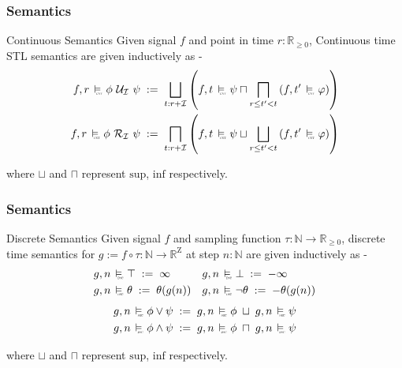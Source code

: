 \documentclass{beamer}
\newcommand{\typeTime}{\mathbb{R}_{\geq 0}}
\newcommand{\typeReal}{\mathbb{R}}
\newcommand{\typeNat}{\mathbb{N}}
\newcommand{\until}{\mathcal{U}}
\newcommand{\release}{\mathcal{R}}
\newcommand{\interval}{\mathcal{I}}
\newcommand{\Z}{\text{Z}}
\newcommand{\discrete}{\raisebox{-0.1ex}{\scalebox{0.25}{\textrm{DSC}}}}
\newcommand{\cont}{\raisebox{-0.1ex}{\scalebox{0.25}{\textrm{CNT}}}}
\newcommand{\discreteSatisfy}{\ \stackMath\stackunder[0pt]{\vDash}{\hspace*{0.3em}\discrete}\ }
\newcommand{\contSatisfy}{\ \stackMath\stackunder[0pt]{\vDash}{\hspace*{0.3em}\cont}\ }
\newcommand{\robustAssign}{\; := \;}
\begin{document}
\begin{frame}
    \frametitle{Semantics}
    \begin{block}{Continuous Semantics}
        Given signal $f$ and point in time $r : \typeTime$,
        Continuous time STL semantics are given inductively as -
        \begin{align*}
            f, r \contSatisfy \phi\ \until_{\interval}\ \psi
           \robustAssign \bigsqcup_{t: r+\interval}\left( f, t \contSatisfy \psi
           \sqcap \bigsqcap_{r \leq t' < t} \left( f, t' \contSatisfy \varphi
            \right ) \right) \\
            f, r \contSatisfy \phi\ \release_{\interval}\ \psi
           \robustAssign \bigsqcap_{t: r+\interval}\left( f, t \contSatisfy \psi
           \sqcup \bigsqcup_{r \leq t' < t} \left( f, t' \contSatisfy \varphi
            \right ) \right)
        \end{align*}
    \end{block}
    where $\sqcup$ and $\sqcap$ represent $\text{sup}$, $\text{inf}$ respectively.
\end{frame}

\begin{frame}
    \frametitle{Semantics}
    \begin{block}{Discrete Semantics}
        Given signal $f$ and sampling function $\tau : \typeNat
        \to \typeTime$, discrete time semantics for $g := f \circ \tau : \typeNat
        \to  \typeReal^{\Z}$ at step $n:\typeNat$ are given inductively as -
        \begin{align*}
              g, n &\discreteSatisfy \top       \robustAssign \infty &
              g, n &\discreteSatisfy \bot       \robustAssign -\infty \\
              g, n &\discreteSatisfy \theta     \robustAssign \theta(g(n)) &
              g, n &\discreteSatisfy \neg\theta \robustAssign -\theta(g(n)) \\
        \end{align*}
        \vspace{-1.6cm}
        \begin{align*}
            g, n \discreteSatisfy \phi \vee \psi  \robustAssign  g, n \discreteSatisfy \phi \; \sqcup \; g, n\discreteSatisfy \psi \\
            g, n \discreteSatisfy \phi \wedge \psi  \robustAssign  g, n \discreteSatisfy \phi \; \sqcap \; g, n \discreteSatisfy \psi \\
        \end{align*}
    \end{block}
    where $\sqcup$ and $\sqcap$ represent $\text{sup}$, $\text{inf}$ respectively.
\end{frame}
\end{document}
